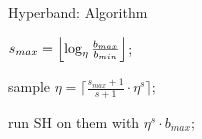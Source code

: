 \begin{frame}{Hyperband: Algorithm}
\begin{minipage}{0.75\textwidth}
\begin{algorithm}[H]
    \LinesNumbered
    \SetAlgoLined
    \setcounter{AlgoLine}{0}
    \DeclarePairedDelimiter\ceil{\lceil}{\rceil}
    \DeclarePairedDelimiter\floor{\lfloor}{\rfloor}
    
    
    $s_{max}=\floor*{\log_{\eta}\frac{b_{max}}{b_{min}}}$;\
    
    {
        sample $\eta=\lceil\frac{s_{max}+1}{s+1} \cdot\eta^{s}\rceil$;\
        
        run SH on them with $\eta^{s}\cdot b_{max}$;\
    }
 
        
    
    \caption*{Pseudocode for Hyperband using SuccessiveHalving (SH) as a subroutine}
\end{algorithm}
\end{minipage}
\end{frame}

    


